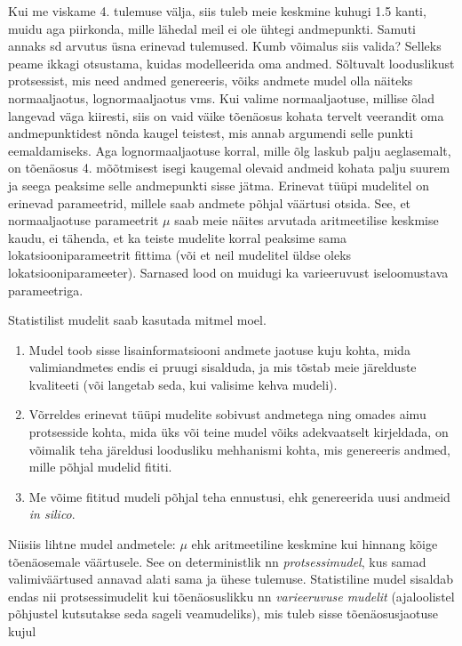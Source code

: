 \documentclass[]{book}
\begin{document}
Kui me viskame 4. tulemuse välja, siis tuleb meie keskmine kuhugi 1.5
kanti, muidu aga piirkonda, mille lähedal meil ei ole ühtegi
andmepunkti. Samuti annaks sd arvutus üsna erinevad tulemused. Kumb
võimalus siis valida? Selleks peame ikkagi otsustama, kuidas
modelleerida oma andmed. Sõltuvalt looduslikust protsessist, mis need
andmed genereeris, võiks andmete mudel olla näiteks normaaljaotus,
lognormaaljaotus vms. Kui valime normaaljaotuse, millise õlad langevad
väga kiiresti, siis on vaid väike tõenäosus kohata tervelt veerandit oma
andmepunktidest nõnda kaugel teistest, mis annab argumendi selle punkti
eemaldamiseks. Aga lognormaaljaotuse korral, mille õlg laskub palju
aeglasemalt, on tõenäosus 4. mõõtmisest isegi kaugemal olevaid andmeid
kohata palju suurem ja seega peaksime selle andmepunkti sisse jätma.
Erinevat tüüpi mudelitel on erinevad parameetrid, millele saab andmete
põhjal väärtusi otsida. See, et normaaljaotuse parameetrit \(\mu\) saab
meie näites arvutada aritmeetilise keskmise kaudu, ei tähenda, et ka
teiste mudelite korral peaksime sama lokatsiooniparameetrit fittima (või
et neil mudelitel üldse oleks lokatsiooniparameeter). Sarnased lood on
muidugi ka varieeruvust iseloomustava parameetriga.

Statistilist mudelit saab kasutada mitmel moel.

\begin{enumerate}
\def\labelenumi{\arabic{enumi}.}
\item
  Mudel toob sisse lisainformatsiooni andmete jaotuse kuju kohta, mida
  valimiandmetes endis ei pruugi sisalduda, ja mis tõstab meie
  järelduste kvaliteeti (või langetab seda, kui valisime kehva mudeli).
\item
  Võrreldes erinevat tüüpi mudelite sobivust andmetega ning omades aimu
  protsesside kohta, mida üks või teine mudel võiks adekvaatselt
  kirjeldada, on võimalik teha järeldusi loodusliku mehhanismi kohta,
  mis genereeris andmed, mille põhjal mudelid fititi.
\item
  Me võime fititud mudeli põhjal teha ennustusi, ehk genereerida uusi
  andmeid \emph{in silico}.
\end{enumerate}

Niisiis lihtne mudel andmetele: \(\mu\) ehk aritmeetiline keskmine kui
hinnang kõige tõenäosemale väärtusele. See on deterministlik nn
\emph{protsessimudel}, kus samad valimiväärtused annavad alati sama ja
ühese tulemuse. Statistiline mudel sisaldab endas nii protsessimudelit
kui tõenäosuslikku nn \emph{varieeruvuse mudelit} (ajaloolistel
põhjustel kutsutakse seda sageli veamudeliks), mis tuleb sisse
tõenäosusjaotuse kujul
\end{document}
